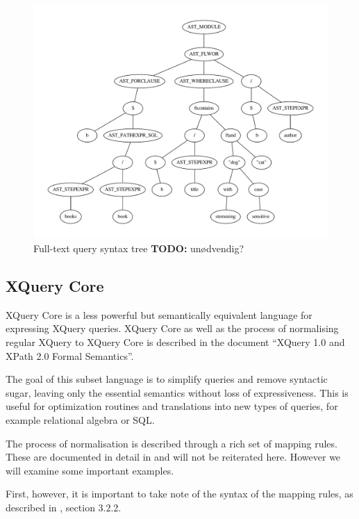 \begin{figure}[h]
  \centering
    \includegraphics[scale=0.50]{img/graphs/ftq1} 
  \caption{Full-text query syntax tree \textbf{\LARGE TODO:} un\o dvendig?}
  \label{figure:xquery:full_text_ast}
\end{figure}

\subsection{XQuery Core}
\label{sect:theory:xquery:XQcore}
XQuery Core is a less powerful but semantically equivalent language for expressing
XQuery queries. XQuery Core as well as the process of normalising regular
XQuery to XQuery Core is described in the document ``XQuery 1.0 and XPath 2.0
Formal Semantics''\cite{xquery_semantics}.

The goal of this subset language is to simplify queries and remove syntactic sugar,
leaving only the essential semantics without loss of expressiveness.
This is useful for optimization routines and translations into new types of
queries, for example relational algebra or SQL.

The process of normalisation is described through a rich set of mapping
rules. These are documented in detail in \cite{xquery_semantics} and will not be reiterated here.
However we will examine some important examples.

First, however, it is important to take note of the syntax of the mapping
rules, as described in \cite{xquery_semantics}, section 3.2.2. 
 
